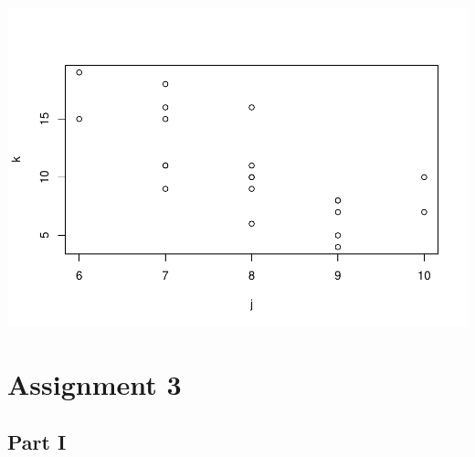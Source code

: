 \documentclass[]{article}
\begin{document}
\includegraphics{macroNoGiodP_files/figure-latex/unnamed-chunk-4-2.pdf}

\section{Assignment 3}\label{assignment-3}

\subsection{Part I}\label{part-i-2}
\end{document}
